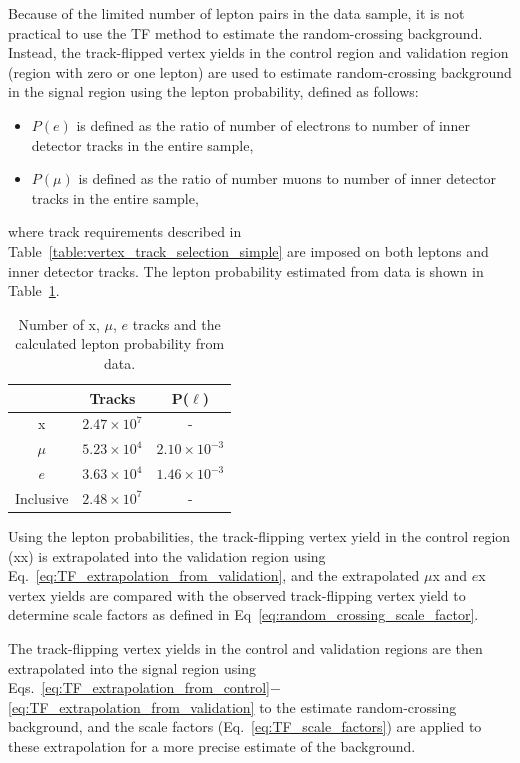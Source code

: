 Because of the limited number of lepton pairs in the data sample, it is not practical to use the TF method to estimate the random-crossing background. Instead, the track-flipped vertex yields in the control region and validation region (region with zero or one lepton) are used to estimate random-crossing background in the signal region using the lepton probability, defined as follows:
\begin{itemize}
\item $P(e)$ is defined as the ratio of number of electrons to number of inner detector tracks in the entire sample,
\item $P(\mu)$ is defined as the ratio of number muons to number of inner detector tracks in the entire sample,
\end{itemize}
where track requirements described in Table~\ref{table:vertex_track_selection_simple} are imposed on both leptons and inner detector tracks. The lepton probability estimated from data is shown in Table~\ref{table:lepton_probability}.

\begin{table}[!htb]%
  \centering
    \begin{tabular}[t]{ccc}
        \hline\hline
                & Tracks             & P($\ell$)           \\
         \hline
         x      & $2.47\times10^{7}$ & -                   \\
         $\mu$  & $5.23\times10^{4}$ & $2.10\times10^{-3}$ \\
         $e$    & $3.63\times10^{4}$ & $1.46\times10^{-3}$ \\
         \hline
         Inclusive    & $2.48\times10^{7}$ & - \\
        \hline\hline
    \end{tabular}
  \caption{Number of x, $\mu$, $e$ tracks and the calculated lepton probability from data.}%
  \label{table:lepton_probability}
\end{table}


Using the lepton probabilities, the track-flipping vertex yield in the control region (xx) is extrapolated into the validation region using Eq.~\ref{eq:TF_extrapolation_from_validation}, and the extrapolated $\mu$x and $e$x vertex yields are compared with the observed track-flipping vertex yield to determine scale factors as defined in Eq~\ref{eq:random_crossing_scale_factor}.

The track-flipping vertex yields in the control and validation regions are then extrapolated into the signal region using Eqs.~\ref{eq:TF_extrapolation_from_control}$-$\ref{eq:TF_extrapolation_from_validation} to the estimate random-crossing background, and the scale factors (Eq.~\ref{eq:TF_scale_factors}) are applied to these extrapolation for a more precise estimate of the background.


